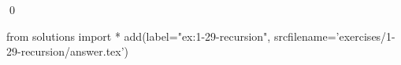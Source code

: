 
\begin{ex}
  \label{ex:1-29-recursion}
  
  \qed
\end{ex}
\begin{python0}
from solutions import *
add(label="ex:1-29-recursion",
    srcfilename='exercises/1-29-recursion/answer.tex')
\end{python0}
